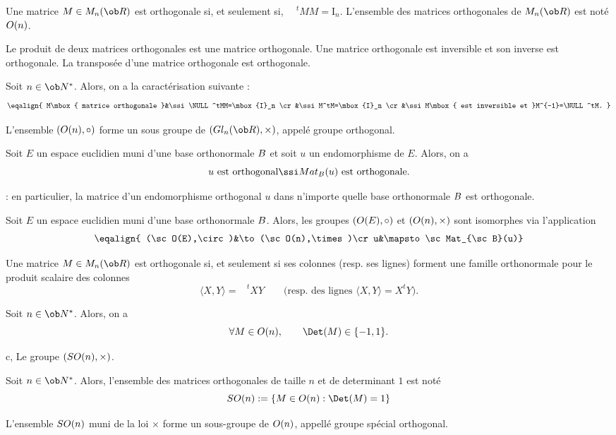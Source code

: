 \Definition []  Une matrice $M\in\sc M_n(\ob R)$ est orthogonale si, et seulement si, $\phantom{\!\!\!\!\!\!M}^tMM=\mbox{I}_n$. \pn
L'ensemble des matrices orthogonales de $\sc M_n(\ob R)$ est noté $\sc O(n)$. 
\bigskip

\Propriete []  Le produit de deux matrices orthogonales est une matrice orthogonale. \pn
Une matrice orthogonale est inversible et son inverse est orthogonale. \pn
La transposée d'une matrice orthogonale est orthogonale. 
\bigskip

\Propriete []  Soit $n\in\ob N^*$. Alors, on a la caractérisation suivante : 
$$
\eqalign{
M\mbox{ matrice orthogonale }&\ssi \NULL^tMM=\mbox{I}_n
\cr
&\ssi M^tM=\mbox{I}_n
\cr
&\ssi M\mbox{ est inversible et }M^{-1}=\NULL^tM.
}
$$

\Propriete []  L'ensemble $(\sc O(n),\circ)$ forme un sous groupe de $(\sc Gl_n(\ob R),\times)$, appelé groupe orthogonal. 
\bigskip

\Propriete []  Soit $E$ un espace euclidien muni d'une base orthonormale $\sc B$ et soit $u$ un endomorphisme de $E$. Alors, on a 
$$
u\mbox{ est orthogonal}\ssi\sc Mat_{\sc B}(u)\mbox{ est orthogonale}.
$$

\Remarque : en particulier, la matrice d'un endomorphisme orthogonal $u$ dans n'importe quelle base orthonormale $\sc B$ est orthogonale. 
\bigskip

\Propriete []  Soit $E$ un espace euclidien muni d'une base orthonormale $\sc B$. Alors, les groupes $(\sc O(E),\circ)$ et $(\sc O(n),\times)$ sont isomorphes via l'application 
$$
\eqalign{ (\sc O(E),\circ)&\to(\sc O(n),\times)\cr  u&\mapsto\sc Mat_{\sc B}(u)}
$$

\Propriete []  Une matrice $M\in\sc M_n(\ob R)$ est orthogonale si, et seulement si ses colonnes (resp. ses lignes) forment une famille orthonormale pour le produit scalaire des colonnes 
$$
\langle X,Y\rangle=\phantom{\!\!\!\!\!\!X}^tXY \qquad \mbox{(resp. des lignes $\langle X,Y\rangle=X^tY$).} 
$$

\Propriete []  Soit $n\in\ob N^*$. Alors, on a 
$$
\forall M\in\sc O(n),\qquad \Det(M)\in\{-1,1\}.
$$



\Subsection c, Le groupe $(\sc{SO}(n),\times)$. 

\Definition []  Soit $n\in\ob N^*$. 
Alors, l'ensemble des matrices orthogonales de taille $n$ et de determinant $1$ est noté 
$$
\sc{SO}(n):=\{M\in\sc O(n):\Det(M)=1\}
$$

\Propriete []  L'ensemble $\sc{SO}(n)$ muni de la loi $\times$ forme un sous-groupe de $\sc O(n)$, 
appellé groupe spécial orthogonal. 
\bigskip

